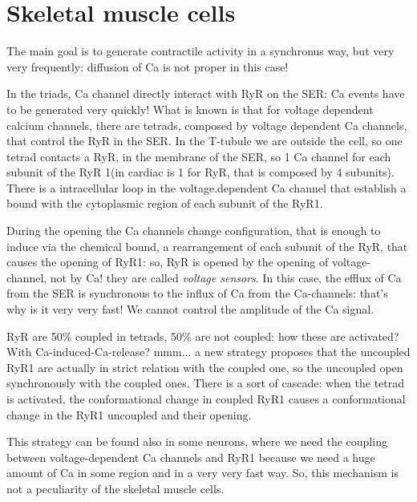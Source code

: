 \documentclass[a4paper, 12pt]{book}
\begin{document}
\section{Skeletal muscle cells}
The main goal is to generate contractile activity in a synchronus way, but very very frequently: diffusion of Ca is not proper in this case!

In the triads, Ca channel directly interact with RyR on the SER: Ca events have to be generated very quickly! What is known is that for voltage dependent calcium channels, there are tetrads, composed by voltage dependent Ca channels, that control the RyR in the SER. In the T-tubule we are outside the cell, so one tetrad contacts a RyR, in the membrane of the SER, so 1 Ca channel for each subunit of the RyR 1(in cardiac is 1 for RyR, that is composed by 4 subunits). There is a intracellular loop in the voltage.dependent Ca channel that establish a bound with the cytoplasmic region of each subunit of the RyR1.


During the opening the Ca channels change configuration, that is enough to induce via the chemical bound, a rearrangement of each subunit of the RyR, that causes the opening of RyR1: so, RyR is opened by the opening of voltage-channel, not by Ca! they are called \emph{voltage sensors}.
In this case, the efflux of Ca from the SER is synchronous to the influx of Ca from the Ca-channels: that's why is it very very fast! We cannot control the amplitude of the Ca signal. 

RyR are 50\% coupled in tetrads, 50\% are not coupled: how these are activated? With Ca-induced-Ca-release? mmm... a new strategy proposes that the uncoupled RyR1 are actually in strict relation with the coupled one, so the uncoupled open synchronously with the coupled ones. There is a sort of cascade: when the tetrad is activated, the conformational change in coupled RyR1 causes a conformational change in the RyR1 uncoupled and their opening.

This strategy can be found also in some neurons, where we need the coupling between voltage-dependent Ca channels and RyR1 because we need a huge amount of Ca in some region and in a very very fast way. So, this mechanism is not a peculiarity of the skeletal muscle cells.
\end{document}
